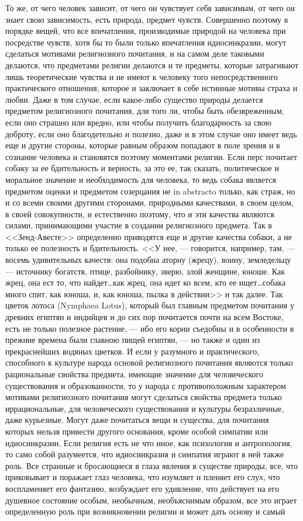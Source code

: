 \documentclass[12pt]{article}
\begin{document}
То же, от чего человек зависит, от чего он чувствует себя зависимым, от чего он знает свою зависимость, есть природа, предмет чувств. Совершенно поэтому в порядке вещей, что все впечатления, производимые природой на человека при посредстве чувств, хотя бы то были только впечатления идиосинкразии, могут сделаться мотивами религиозного почитания, и на самом деле таковыми делаются, что предметами религии делаются и те предметы, которые затрагивают лишь теоретические чувства и не имеют к человеку того непосредственного практического отношения, которое и заключает в себе истинные мотивы страха и любви. Даже в том случае, если какое-либо существо природы делается предметом религиозного почитания, для того ли, чтобы быть обезвреженным, если оно страшно или вредно, или чтобы получить благодарность за свою доброту, если оно благодетельно и полезно, даже и в этом случае оно имеет ведь еще и другие стороны, которые равным образом попадают в поле зрения и в сознание человека и становятся поэтому моментами религии. Если перс почитает собаку за ее бдительность и верность, за это ее, так сказать, политическое и моральное значение и необходимость для человека, то ведь собака является предметом оценки и предметом созерцания не in abstracto только, как страж, но и со всеми своими другими сторонами, природными качествами, в своем целом, в своей совокупности, и естественно поэтому, что и эти качества являются силами, принимающими участие в создании религиозного предмета. Так в <<Зенд-Авесте>> определенно приводятся еще и другие качества собаки, а не только ее полезность и бдительность. <<У нее, --- говорится, например, там, --- восемь удивительных качеств: она подобна аторну (жрецу), воину, земледельцу --- источнику богатств, птице, разбойнику, зверю, злой женщине, юноше. Как жрец, она ест то, что найдет\dots как жрец, она идет ко всем, кто ее ищет\dots собака много спит, как юноша, и, как юноша, пылка в действии>> и так далее. Так цветок лотоса (Nymphaea Lotus), который был главным предметом почитания у древних египтян и индийцев и до сих пор почитается почти на всем Востоке, есть не только полезное растение, --- ибо его корни съедобны и в особенности в прежние времена были главною пищей египтян, --- но также и один из прекраснейших водяных цветков. И если у разумного и практического, способного к культуре народа основой религиозного почитания являются только рациональные свойства предмета, имеющие значение для человеческого существования и образованности, то у народа с противоположным характером мотивами религиозного почитания могут сделаться свойства предмета только иррациональные, для человеческого существования и культуры безразличные, даже курьезные. Могут даже почитаться вещи и существа, для почитания которых нельзя привести другого основания, кроме особой симпатии или идиосинкразии. Если религия есть не что иное, как психология и антропология, то само собой разумеется, что идиосинкразия и симпатия играют в ней также роль. Все странные и бросающиеся в глаза явления в существе природы, все, что приковывает и поражает глаз человека, что изумляет и пленяет его слух, что воспламеняет его фантазию, возбуждает его удивление, что действует на его душевное состояние особым, необычным, необъяснимым образом, все это играет определенную роль при возникновении религии и может дать основу и самый 
\end{document}

